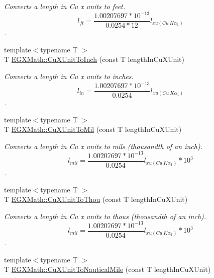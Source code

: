 \begin{DoxyCompactItemize}
\begin{DoxyCompactList}\small\item\em Converts a length in Cu x units to feet. \[ l_{ft}= \frac{1.00207697*10^{-13}}{0.0254 * 12} l_{xu(Cu\ K\alpha_1)} \]. \end{DoxyCompactList}\item 
{\footnotesize template$<$typename T $>$ }\\T \mbox{\hyperlink{group___e_g_x_math-_conversions-_length_conversions-_non-_s_i-_cu_x_unit-_imperial_ga7b5e4603f02f1aefa96487f4a19b2930}{E\+G\+X\+Math\+::\+Cu\+X\+Unit\+To\+Inch}} (const T length\+In\+Cu\+X\+Unit)
\begin{DoxyCompactList}\small\item\em Converts a length in Cu x units to inches. \[ l_{in}= \frac{1.00207697*10^{-13}}{0.0254} l_{xu(Cu\ K\alpha_1)} \]. \end{DoxyCompactList}\item 
{\footnotesize template$<$typename T $>$ }\\T \mbox{\hyperlink{group___e_g_x_math-_conversions-_length_conversions-_non-_s_i-_cu_x_unit-_imperial_ga060d8ffc384bcba07e0fde612e1a2156}{E\+G\+X\+Math\+::\+Cu\+X\+Unit\+To\+Mil}} (const T length\+In\+Cu\+X\+Unit)
\begin{DoxyCompactList}\small\item\em Converts a length in Cu x units to mils (thousandth of an inch). \[ l_{mil}= \frac{1.00207697*10^{-13}}{0.0254} l_{xu(Cu\ K\alpha_1)} * 10^{3} \]. \end{DoxyCompactList}\item 
{\footnotesize template$<$typename T $>$ }\\T \mbox{\hyperlink{group___e_g_x_math-_conversions-_length_conversions-_non-_s_i-_cu_x_unit-_imperial_ga3d9558a94551b20c5492dba8f01fcff6}{E\+G\+X\+Math\+::\+Cu\+X\+Unit\+To\+Thou}} (const T length\+In\+Cu\+X\+Unit)
\begin{DoxyCompactList}\small\item\em Converts a length in Cu x units to thous (thousandth of an inch). \[ l_{mil}= \frac{1.00207697*10^{-13}}{0.0254} l_{xu(Cu\ K\alpha_1)} * 10^{3} \]. \end{DoxyCompactList}\item 
{\footnotesize template$<$typename T $>$ }\\T \mbox{\hyperlink{group___e_g_x_math-_conversions-_length_conversions-_non-_s_i-_cu_x_unit-_nautical_gaaa51a984890efeec739a702b982fad57}{E\+G\+X\+Math\+::\+Cu\+X\+Unit\+To\+Nautical\+Mile}} (const T length\+In\+Cu\+X\+Unit)

\end{DoxyCompactItemize}
